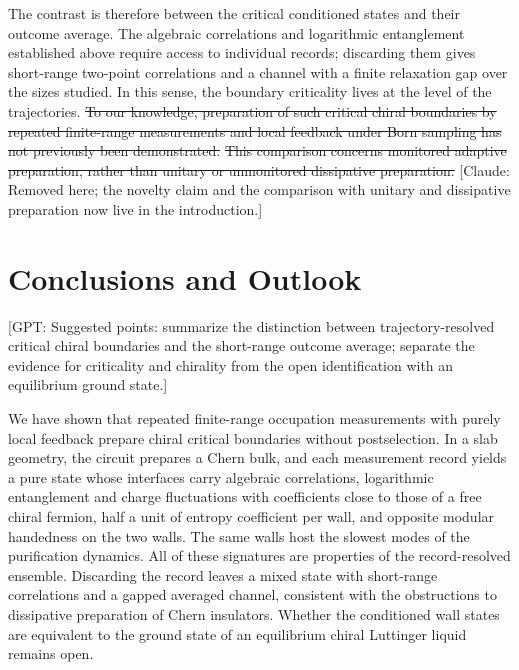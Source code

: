 \documentclass[aps,prb,10pt,twocolumn,superscriptaddress,longbibliography,floatfix]{revtex4-2}
\newcommand{\GPT}[1]{{\color{magenta}[GPT: #1]}}
\newcommand{\claudeadd}[1]{{\color{orange}#1}}
\newcommand{\claudecom}[1]{{\color{ForestGreen}[Claude: #1]}}
\newcommand{\claudedel}[1]{{\color{orange}\sout{#1}}}
\begin{document}
{The contrast is therefore between the critical conditioned states and their outcome average. The algebraic correlations and logarithmic entanglement established above require access to individual records; discarding them gives short-range two-point correlations and a channel with a finite relaxation gap over the sizes studied. In this sense, the boundary criticality lives at the level of the trajectories. \claudedel{To our knowledge, preparation of such critical chiral boundaries by repeated finite-range measurements and local feedback under Born sampling has not previously been demonstrated.} \claudedel{This comparison concerns monitored adaptive preparation, rather than unitary or unmonitored dissipative preparation.} \claudecom{Removed here; the novelty claim and the comparison with unitary and dissipative preparation now live in the introduction.}
}



\FloatBarrier
{\color{blue}\section{Conclusions and Outlook}
\label{sec:Conclusions}}

\GPT{Suggested points: summarize the distinction between trajectory-resolved critical chiral boundaries and the short-range outcome average; separate the evidence for criticality and chirality from the open identification with an equilibrium ground state.}

\claudeadd{We have shown that repeated finite-range occupation measurements with purely local feedback prepare chiral critical boundaries without postselection. In a slab geometry, the circuit prepares a Chern bulk, and each measurement record yields a pure state whose interfaces carry algebraic correlations, logarithmic entanglement and charge fluctuations with coefficients close to those of a free chiral fermion, half a unit of entropy coefficient per wall, and opposite modular handedness on the two walls. The same walls host the slowest modes of the purification dynamics. All of these signatures are properties of the record-resolved ensemble. Discarding the record leaves a mixed state with short-range correlations and a gapped averaged channel, consistent with the obstructions to dissipative preparation of Chern insulators. Whether the conditioned wall states are equivalent to the ground state of an equilibrium chiral Luttinger liquid remains open.}
\end{document}
